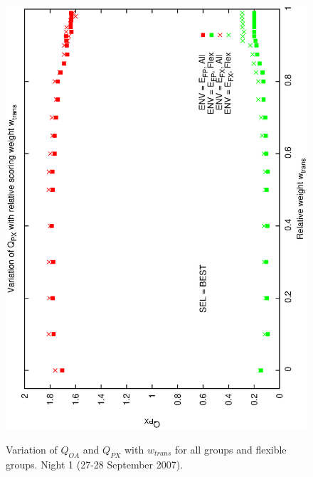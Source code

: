\begin{figure}[h]
\begin{center}
{    \includegraphics[scale=0.5, angle=-90]{figures/cs1_dw1_px_c.eps}
    \label{fig:cs1_dw1_px_c}
  }
 \caption[Variation of $Q_{OA}$ and $Q_{PX}$ with $w_{trans}$  for all groups and flexible groups]
{Variation of $Q_{OA}$ and $Q_{PX}$ with $w_{trans}$  for all groups and flexible groups. Night 1 (27-28 September 2007).}
\end{center}
\end{figure}

